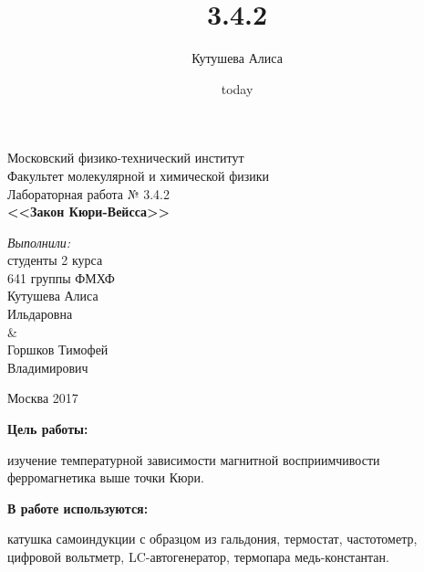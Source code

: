 \documentclass[a4paper,12pt]{article}
\title{3.4.2}
\author{Кутушева Алиса}
\date{today}
\begin{document}
	
	\begin{titlepage}
		\begin{center} 
			
			\large Московский физико-технический институт\\
			Факультет молекулярной и химической физики\\
			\vspace{7cm}
			\huge Лабораторная работа № 3.4.2\\
			\textbf{\Large <<Закон Кюри-Вейсса>>}\\
		\end{center} 
		
		\vspace{7.5cm}
		{\par \raggedleft \large \emph{Выполнили:}\\ студенты 2 курса\\ 641 группы ФМХФ\\ Кутушева Алиса\\ Ильдаровна \\ \& \\Горшков Тимофей \\Владимирович \par}
		\begin{center}
			\vfill Москва 2017
		\end{center}
	\end{titlepage}
\newpage
\setcounter{page}{2}

\begin{center}
\end{center}

	\hspace{0.2cm}\textbf{Цель работы:}
	\par изучение температурной зависимости магнитной восприимчивости ферромагнетика выше точки Кюри.


	\hspace{0.2cm}\textbf{В работе используются:}
	\par катушка самоиндукции с образцом из гальдония, термостат, частотометр, цифровой вольтметр, LC-автогенератор, термопара медь-константан.
	
\end{document}
